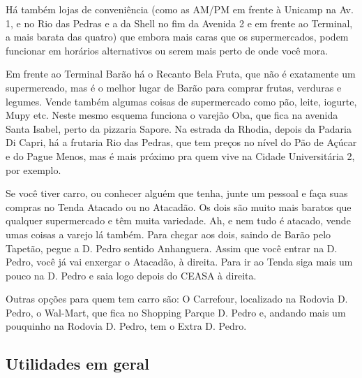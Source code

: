 Há também lojas de conveniência (como as AM/PM em frente à Unicamp na Av. 1, e
no Rio das Pedras e a da Shell no fim da Avenida 2 e em frente ao Terminal, a
mais barata das quatro) que embora mais caras que os supermercados, podem
funcionar em horários alternativos ou serem mais perto de onde você mora.

Em frente ao Terminal Barão há o Recanto Bela Fruta, que não é exatamente um
supermercado, mas é o melhor lugar de Barão para comprar frutas, verduras e
legumes. Vende também algumas coisas de supermercado como pão, leite, iogurte,
Mupy etc. Neste mesmo esquema funciona o varejão Oba, que fica na avenida Santa
Isabel, perto da pizzaria Sapore. Na estrada da Rhodia, depois da Padaria Di
Capri, há a frutaria Rio das Pedras, que tem preços no nível do Pão de Açúcar e
do Pague Menos, mas é mais próximo pra quem vive na Cidade Universitária 2, por
exemplo.

Se você tiver carro, ou conhecer alguém que tenha, junte um pessoal e faça suas
compras no Tenda Atacado ou no Atacadão. Os dois são muito mais baratos que
qualquer supermercado e têm muita variedade. Ah, e nem tudo é atacado, vende
umas coisas a varejo lá também. Para chegar aos dois, saindo de Barão pelo
Tapetão, pegue a D. Pedro sentido Anhanguera. Assim que você entrar na D. Pedro,
você já vai enxergar o Atacadão, à direita. Para ir ao Tenda siga mais um pouco
na D.  Pedro e saia logo depois do CEASA à direita.

Outras opções para quem tem carro são: O Carrefour, localizado na Rodovia D.
Pedro, o Wal-Mart, que fica no Shopping Parque D. Pedro e, andando mais um 
pouquinho na Rodovia D. Pedro, tem o Extra D. Pedro.

\subsection{Utilidades em geral}

